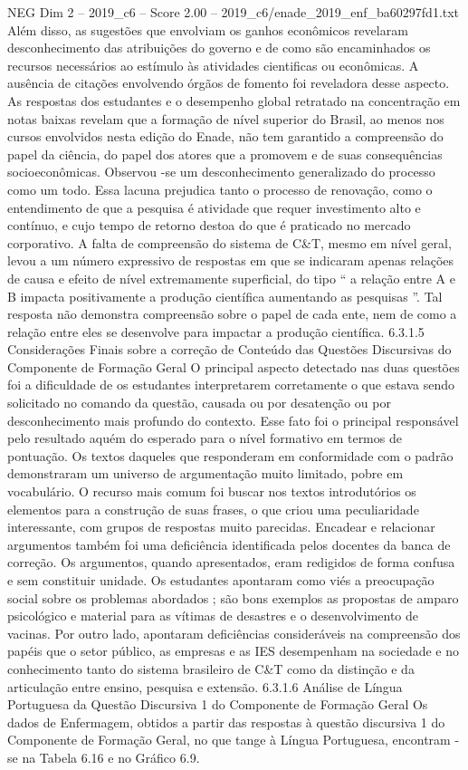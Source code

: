 \begin{textsample}{NEG Dim 2 – 2019\_c6 – Score 2.00 – 2019\_c6/enade\_2019\_enf\_ba60297fd1.txt}
Além disso, as sugestões que envolviam os ganhos econômicos revelaram desconhecimento das atribuições do governo e de como são encaminhados os recursos necessários ao estímulo às atividades cientificas ou econômicas.
A ausência de citações envolvendo órgãos de fomento foi reveladora desse aspecto.
As respostas dos estudantes e o desempenho global retratado na concentração em notas baixas revelam que a formação de nível superior do Brasil, ao menos nos cursos envolvidos nesta edição do Enade, não tem garantido a compreensão do papel da ciência, do papel dos atores que a promovem e de suas consequências socioeconômicas.
Observou -se um desconhecimento generalizado do processo como um todo.
Essa lacuna prejudica tanto o processo de renovação, como o entendimento de que a pesquisa é atividade que requer investimento alto e contínuo, e cujo tempo de retorno destoa do que é praticado no mercado corporativo.
A falta de compreensão do sistema de C\&T, mesmo em nível geral, levou a um número expressivo de respostas em que se indicaram apenas relações de causa e efeito de nível extremamente superficial, do tipo “ a relação entre A e B impacta positivamente a produção científica aumentando as pesquisas ”.
Tal resposta não demonstra compreensão sobre o papel de cada ente, nem de como a relação entre eles se desenvolve para impactar a produção científica. 6.3.1.5 Considerações Finais sobre a correção de Conteúdo das Questões Discursivas do Componente de Formação Geral O principal aspecto detectado nas duas questões foi a dificuldade de os estudantes interpretarem corretamente o que estava sendo solicitado no comando da questão, causada ou por desatenção ou por desconhecimento mais profundo do contexto.
Esse fato foi o principal responsável pelo resultado aquém do esperado para o nível formativo em termos de pontuação.
Os textos daqueles que responderam em conformidade com o padrão demonstraram um universo de argumentação muito limitado, pobre em vocabulário.
O recurso mais comum foi buscar nos textos introdutórios os elementos para a construção de suas frases, o que criou uma peculiaridade interessante, com grupos de respostas muito parecidas.
Encadear e relacionar argumentos também foi uma deficiência identificada pelos docentes da banca de correção.
Os argumentos, quando apresentados, eram redigidos de forma confusa e sem constituir unidade.
Os estudantes apontaram como viés a preocupação social sobre os problemas abordados ; são bons exemplos as propostas de amparo psicológico e material para as vítimas de desastres e o desenvolvimento de vacinas.
Por outro lado, apontaram deficiências consideráveis na compreensão dos papéis que o setor público, as empresas e as IES desempenham na sociedade e no conhecimento tanto do sistema brasileiro de C\&T como da distinção e da articulação entre ensino, pesquisa e extensão. 6.3.1.6 Análise de Língua Portuguesa da Questão Discursiva 1 do Componente de Formação Geral Os dados de Enfermagem, obtidos a partir das respostas à questão discursiva 1 do Componente de Formação Geral, no que tange à Língua Portuguesa, encontram -se na Tabela 6.16 e no Gráfico 6.9.

\end{textsample}
